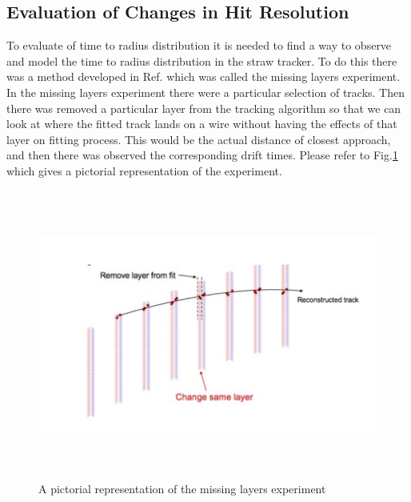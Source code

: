 \documentclass[./Thesis]{subfiles}
\begin{document}
\subsection{Evaluation of Changes in Hit Resolution}

To evaluate of time to radius distribution it is needed to find a way to observe and model the time to radius distribution in the straw tracker. To do this there was a method developed in Ref.\cite{jMottmiss} which was called the missing layers experiment. In the missing layers experiment there were a particular selection of tracks. Then there was removed a particular layer from the tracking algorithm so that we can look at where the fitted track lands on a wire without having the effects of that layer on fitting process. This would be the actual distance of closest approach, and then there was observed the corresponding drift times. Please refer to Fig.\ref{fig:Missing Layers} which gives a pictorial representation of the experiment.

\begin{figure}
	\centerline{\includegraphics[height=95mm]{MissingLayers.jpeg}}
	\caption[Missing Layers]{ A pictorial representation of the missing layers experiment \cite{jMottmiss}}
	\label{fig:Missing Layers}
\end{figure}
\end{document}
